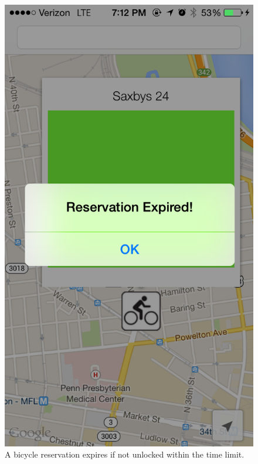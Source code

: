 \documentclass{sig-alternate}
\begin{document}
\begin{figure}[htb!]
\begin{minipage}[b]{0.46\linewidth}
	\includegraphics[width=1\linewidth]{img_0252}
	\caption{A bicycle reservation expires if not unlocked within the time limit.}
\label{fig:minipage2}
\end{minipage}
\end{figure}
\end{document}
